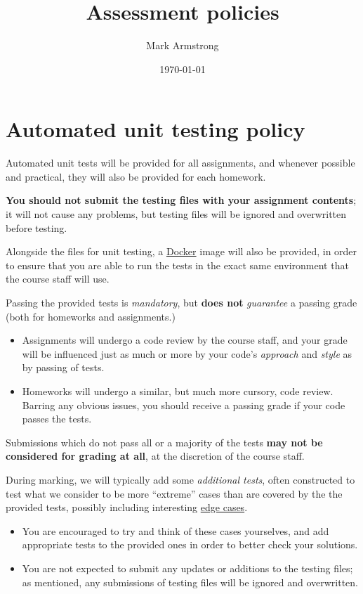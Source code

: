 \documentclass[11pt]{article}
\author{Mark Armstrong}
\date{\today}
\title{Assessment policies}
\begin{document}
\maketitle
\tableofcontents


\section{Automated unit testing policy}
\label{sec:orga2af092}
Automated unit tests will be provided for all assignments,
and whenever possible and practical,
they will also be provided for each homework.

\textbf{You should not submit the testing files with your assignment contents};
it will not cause any problems, but testing files will be ignored
and overwritten before testing.

Alongside the files for unit testing,
a \href{https://docker.com}{Docker} image
will also be provided, in order to ensure that
you are able to run the tests in the exact same environment
that the course staff will use.

Passing the provided tests is \emph{mandatory},
but \textbf{does not} \emph{guarantee} a passing grade
(both for homeworks and assignments.)
\begin{itemize}
\item Assignments will undergo a code review by the course staff,
and your grade will be influenced just as much or more
by your code's \emph{approach} and \emph{style} as by passing of tests.
\item Homeworks will undergo a similar, but much more cursory, code review.
Barring any obvious issues, you should receive a passing grade
if your code passes the tests.
\end{itemize}
Submissions which do not pass
all or a majority of the tests \textbf{may not be considered for grading at all},
at the discretion of the course staff.

During marking, we will typically add some \emph{additional tests},
often constructed to test what we consider to be
more “extreme” cases than are covered by the the provided tests,
possibly including interesting \href{https://en.wikipedia.org/wiki/Edge\_case}{edge cases}.
\begin{itemize}
\item You are encouraged to try and think of these cases yourselves,
and add appropriate tests to the provided ones
in order to better check your solutions.
\item You are not expected to submit any updates or additions
to the testing files; as mentioned, any submissions of testing files
will be ignored and overwritten.
\end{itemize}
\end{document}

